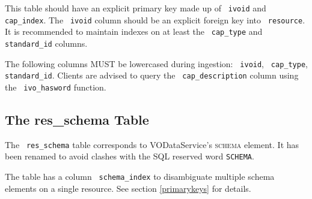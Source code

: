 \documentclass[11pt,a4paper]{ivoa}
\newcommand{\rtent}[1]{\texttt{\color{rtcolor} #1}}
\newcommand{\vorent}[1]{\textsc{#1}}
\begin{document}

 

This table should have an explicit primary key made up of
\rtent{ivoid} and \rtent{cap\_index}.
The \rtent{ivoid} column should be
an explicit foreign key into \rtent{resource}.
It is recommended to maintain indexes on at least the 
\rtent{cap\_type} and \rtent{standard\_id} columns.

The following columns MUST be lowercased during ingestion:
\rtent{ivoid}, \rtent{cap\_type}, \rtent{standard\_id}.
Clients are advised to query the \rtent{cap\_description} column
using the \rtent{ivo\_hasword} function.




\subsection{The res\_schema Table}

\label{table_res_schema}

The \rtent{res\_schema} table corresponds to VODataService's
\vorent{schema} element.  It has been renamed to avoid clashes with
the SQL reserved word \texttt{SCHEMA}.

The table has a column \rtent{schema\_index} to disambiguate
multiple schema elements on a single resource.  See section \ref{primarykeys} for details.


\end{document}
